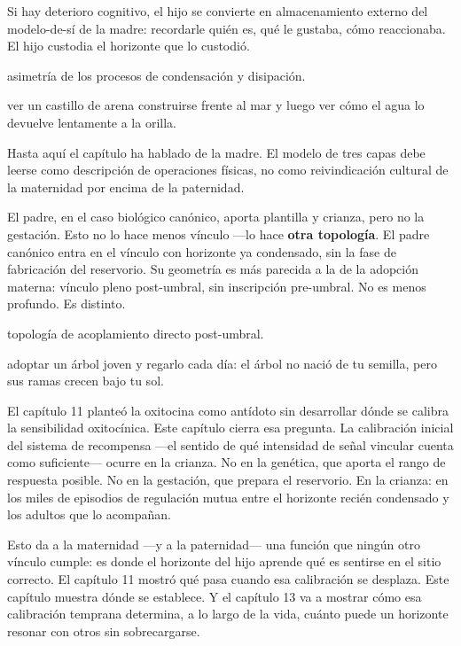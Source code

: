 Si hay deterioro cognitivo, el hijo se convierte en almacenamiento externo del modelo-de-sí de la madre: recordarle quién es, qué le gustaba, cómo reaccionaba. El hijo custodia el horizonte que lo custodió.

\begin{fisica}
 asimetría de los procesos de condensación y disipación.

 ver un castillo de arena construirse frente al mar y luego ver cómo el agua lo devuelve lentamente a la orilla.
\end{fisica}
\noindent Hasta aquí el capítulo ha hablado de la madre. El modelo de tres capas debe leerse como descripción de operaciones físicas, no como reivindicación cultural de la maternidad por encima de la paternidad.

El padre, en el caso biológico canónico, aporta plantilla y crianza, pero no la gestación. Esto no lo hace menos vínculo —lo hace \textbf{otra topología}. El padre canónico entra en el vínculo con horizonte ya condensado, sin la fase de fabricación del reservorio. Su geometría es más parecida a la de la adopción materna: vínculo pleno post-umbral, sin inscripción pre-umbral. No es menos profundo. Es distinto.

\begin{fisica}
 topología de acoplamiento directo post-umbral.

 adoptar un árbol joven y regarlo cada día: el árbol no nació de tu semilla, pero sus ramas crecen bajo tu sol.
\end{fisica}
\noindent El capítulo 11 planteó la oxitocina como antídoto sin desarrollar dónde se calibra la sensibilidad oxitocínica. Este capítulo cierra esa pregunta. La calibración inicial del sistema de recompensa —el sentido de qué intensidad de señal vincular cuenta como suficiente— ocurre en la crianza. No en la genética, que aporta el rango de respuesta posible. No en la gestación, que prepara el reservorio. En la crianza: en los miles de episodios de regulación mutua entre el horizonte recién condensado y los adultos que lo acompañan.

Esto da a la maternidad —y a la paternidad— una función que ningún otro vínculo cumple: es donde el horizonte del hijo aprende qué es sentirse en el sitio correcto. El capítulo 11 mostró qué pasa cuando esa calibración se desplaza. Este capítulo muestra dónde se establece. Y el capítulo 13 va a mostrar cómo esa calibración temprana determina, a lo largo de la vida, cuánto puede un horizonte resonar con otros sin sobrecargarse.

